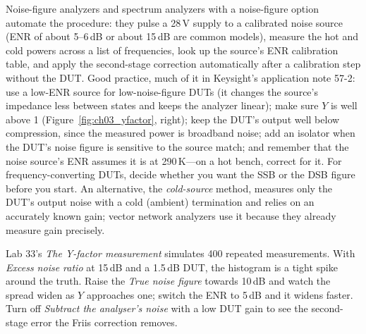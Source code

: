 
\begin{inpractice}
Noise-figure analyzers and spectrum analyzers with a noise-figure option automate the procedure: they pulse
a 28\,V supply to a calibrated noise source (ENR of about 5--6\,dB or about 15\,dB are common models),
measure the hot and cold powers across a list of frequencies, look up the source's ENR calibration table,
and apply the second-stage correction automatically after a calibration step without the DUT. Good
practice, much of it in Keysight's application note 57-2: use a low-ENR source for low-noise-figure DUTs
(it changes the source's impedance less between states and keeps the analyzer linear); make sure $Y$ is
well above 1 (Figure~\ref{fig:ch03_yfactor}, right); keep the DUT's output well below compression, since the
measured power is broadband noise; add an isolator when the DUT's noise figure is sensitive to the source
match; and remember that the noise source's ENR assumes it is at 290\,K---on a hot bench, correct for it.
For frequency-converting DUTs, decide whether you want the SSB or the DSB figure before you start. An
alternative, the \emph{cold-source} method, measures only the DUT's output noise with a cold (ambient)
termination and relies on an accurately known gain; vector network analyzers use it because they already
measure gain precisely.
\end{inpractice}

\begin{tryit}
Lab 33's \emph{The Y-factor measurement} simulates 400 repeated measurements. With \emph{Excess noise ratio}
at 15\,dB and a 1.5\,dB DUT, the histogram is a tight spike around the truth. Raise the \emph{True noise
figure} towards 10\,dB and watch the spread widen as $Y$ approaches one; switch the ENR to 5\,dB and it
widens faster. Turn off \emph{Subtract the analyser's noise} with a low DUT gain to see the second-stage
error the Friis correction removes.
\end{tryit}

